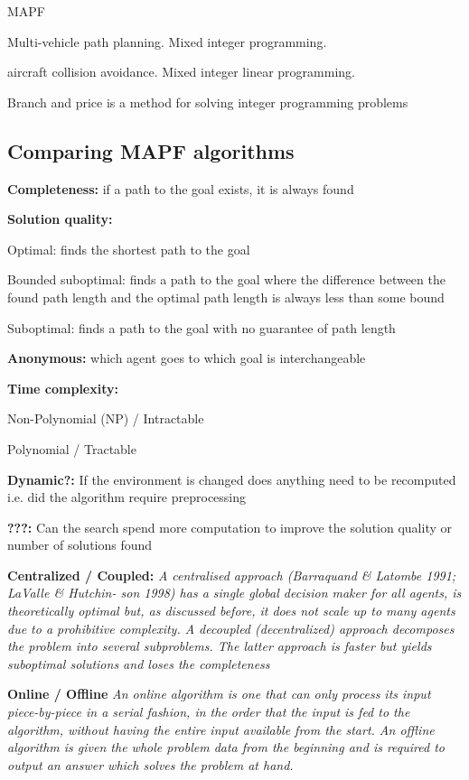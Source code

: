 \documentclass[a4paper,11pt]{article}
\begin{document}
MAPF

\cite{schouwenaars2001mixed} Multi-vehicle path planning. Mixed integer programming.

\cite{richards2002aircraft} aircraft collision avoidance. Mixed integer linear programming.

Branch and price is a method for solving integer programming problems





\subsection{Comparing MAPF algorithms}

{\setlength{\parindent}{0cm}

\textbf{Completeness:} if a path to the goal exists, it is always found

\textbf{Solution quality:}
	\begin{compactitem}
		\item Optimal: finds the shortest path to the goal
		\item Bounded suboptimal: finds a path to the goal where the difference between the found path length and the optimal path length is always less than some bound
		\item Suboptimal: finds a path to the goal with no guarantee of path length
	\end{compactitem}

\textbf{Anonymous:} which agent goes to which goal is interchangeable

\textbf{Time complexity:}
	\begin{compactitem}
		\item Non-Polynomial (NP) / Intractable
		\item Polynomial / Tractable
	\end{compactitem}

\textbf{Dynamic?:} If the environment is changed does anything need to be recomputed i.e. did the algorithm require preprocessing

\textbf{???:} Can the search spend more computation to improve the solution quality or number of solutions found

\textbf{Centralized / Coupled:} \textit{A centralised approach (Barraquand \& Latombe 1991; LaValle \& Hutchin- son 1998) has a single global decision maker for all agents, is theoretically optimal but, as discussed before, it does not scale up to many agents due to a prohibitive complexity. A decoupled (decentralized) approach decomposes the problem into several subproblems. The latter approach is faster but yields suboptimal solutions and loses the completeness} \cite{wang2008fast}

\textbf{Online / Offline} \textit{An online algorithm is one that can only process its input piece-by-piece in a serial fashion, in the order that the input is fed to the algorithm, without having the entire input available from the start. An offline algorithm is given the whole problem data from the beginning and is required to output an answer which solves the problem at hand.}
} %
\end{document}
